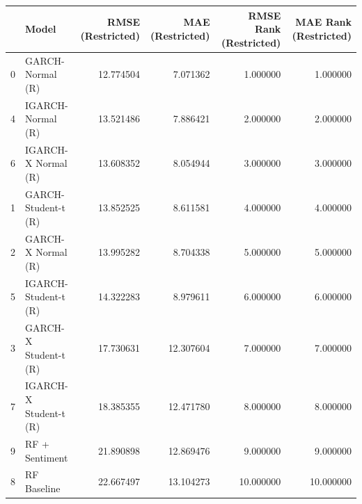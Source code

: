 \begin{table}[htbp]
\centering
\begin{tabular}{llrrrr}
\toprule
 & Model & RMSE (Restricted) & MAE (Restricted) & RMSE Rank (Restricted) & MAE Rank (Restricted) \\
\midrule
0 & GARCH-Normal (R) & 12.774504 & 7.071362 & 1.000000 & 1.000000 \\
4 & IGARCH-Normal (R) & 13.521486 & 7.886421 & 2.000000 & 2.000000 \\
6 & IGARCH-X Normal (R) & 13.608352 & 8.054944 & 3.000000 & 3.000000 \\
1 & GARCH-Student-t (R) & 13.852525 & 8.611581 & 4.000000 & 4.000000 \\
2 & GARCH-X Normal (R) & 13.995282 & 8.704338 & 5.000000 & 5.000000 \\
5 & IGARCH-Student-t (R) & 14.322283 & 8.979611 & 6.000000 & 6.000000 \\
3 & GARCH-X Student-t (R) & 17.730631 & 12.307604 & 7.000000 & 7.000000 \\
7 & IGARCH-X Student-t (R) & 18.385355 & 12.471780 & 8.000000 & 8.000000 \\
9 & RF + Sentiment & 21.890898 & 12.869476 & 9.000000 & 9.000000 \\
8 & RF Baseline & 22.667497 & 13.104273 & 10.000000 & 10.000000 \\
\bottomrule
\end{tabular}
\label{tab:robustness_restricted_window}
\end{table}

